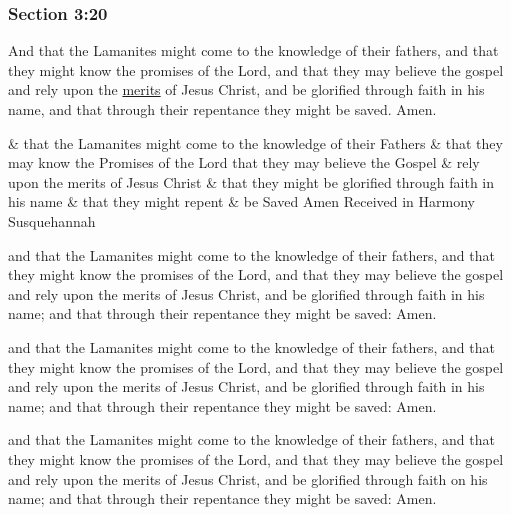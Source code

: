 	\subsubsection{Section 3:20} %
		\label{DC3-20}

		And that the Lamanites might come to the knowledge of their fathers, and that they might know the promises of the Lord, and that they may believe the gospel and rely upon the \hyperref[MERIT]{merits} of Jesus Christ, and be glorified through faith in his name, and that through their repentance they might be saved. Amen.

		\begin{framed}
		\scriptsize
			\begin{compactdesc}
				\item[JSP] \& that the Lamanites might come to the knowledge of their Fathers \& that they may know the Promises of the Lord that they may believe the Gospel \& rely upon the merits of Jesus Christ \& that they might be glorified through faith in his name \& that they might repent \& be Saved Amen Received in Harmony Susquehannah
				\item[BC] and that the Lamanites might come to the knowledge of their fathers, and that they might know the promises of the Lord, and that they may believe the gospel and rely upon the merits of Jesus Christ, and be glorified through faith in his name; and that through their repentance they might be saved: Amen.
				\item[DC 1835] and that the Lamanites might come to the knowledge of their fathers, and that they might know the promises of the Lord, and that they may believe the gospel and rely upon the merits of Jesus Christ, and be glorified through faith in his name; and that through their repentance they might be saved: Amen.
				\item[DC 1844] and that the Lamanites might come to the knowledge of their fathers, and that they might know the promises of the Lord, and that they may believe the gospel and rely upon the merits of Jesus Christ, and be glorified through faith on his name; and that through their repentance they might be saved: Amen.
			\end{compactdesc}
		\end{framed}